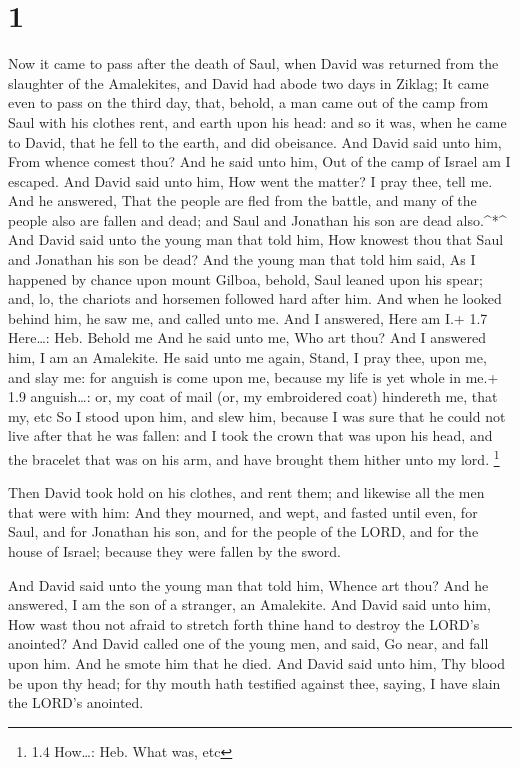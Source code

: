 \hypertarget{section}{%
\section{1}\label{section}}

 Now it came to pass after the death of Saul, when David was
returned from the slaughter of the Amalekites, and David had abode two
days in Ziklag;  It came even to pass on the third day,
that, behold, a man came out of the camp from Saul with his clothes
rent, and earth upon his head: and so it was, when he came to David,
that he fell to the earth, and did obeisance.  And David
said unto him, From whence comest thou? And he said unto him, Out of the
camp of Israel am I escaped.  And David said unto him, How
went the matter? I pray thee, tell me. And he answered, That the people
are fled from the battle, and many of the people also are fallen and
dead; and Saul and Jonathan his son are dead also.\^{}*\^{} 
And David said unto the young man that told him, How knowest thou that
Saul and Jonathan his son be dead?  And the young man that
told him said, As I happened by chance upon mount Gilboa, behold, Saul
leaned upon his spear; and, lo, the chariots and horsemen followed hard
after him.  And when he looked behind him, he saw me, and
called unto me. And I answered, Here am I.+ 1.7 Here\ldots: Heb. Behold
me  And he said unto me, Who art thou? And I answered him, I
am an Amalekite.  He said unto me again, Stand, I pray thee,
upon me, and slay me: for anguish is come upon me, because my life is
yet whole in me.+ 1.9 anguish\ldots: or, my coat of mail (or, my
embroidered coat) hindereth me, that my, etc  So I stood
upon him, and slew him, because I was sure that he could not live after
that he was fallen: and I took the crown that was upon his head, and the
bracelet that was on his arm, and have brought them hither unto my lord.
\footnote{1.4 How\ldots: Heb. What was, etc}

 Then David took hold on his clothes, and rent them; and
likewise all the men that were with him:  And they mourned,
and wept, and fasted until even, for Saul, and for Jonathan his son, and
for the people of the LORD, and for the house of Israel; because they
were fallen by the sword.

 And David said unto the young man that told him, Whence
art thou? And he answered, I am the son of a stranger, an Amalekite.
 And David said unto him, How wast thou not afraid to
stretch forth thine hand to destroy the LORD's anointed? 
And David called one of the young men, and said, Go near, and fall upon
him. And he smote him that he died.  And David said unto
him, Thy blood be upon thy head; for thy mouth hath testified against
thee, saying, I have slain the LORD's anointed.

